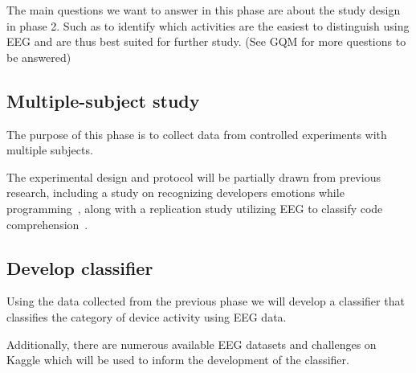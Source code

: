 \documentclass{IEEEtran}
\begin{document}
\begin{refsection}
The main questions we want to answer in this phase are about the study design in phase 2. Such as to identify which activities are the easiest to distinguish using EEG and are thus best suited for further study. (See GQM for more questions to be answered)

\subsection{Multiple-subject study}


The purpose of this phase is to collect data from controlled experiments with multiple subjects.

The experimental design and protocol will be partially drawn from previous research, including a study on recognizing developers emotions while programming~\cite{girardi_recognizing_2020}, along with a replication study utilizing EEG to classify code comprehension~\cite{fucci_replication_2019}.

\subsection{Develop classifier}

Using the data collected from the previous phase we will develop a classifier that classifies the category of device activity using EEG data.

Additionally, there are numerous available EEG datasets and challenges on Kaggle which will be used to inform the development of the classifier.




%




\end{refsection}
\end{document}
